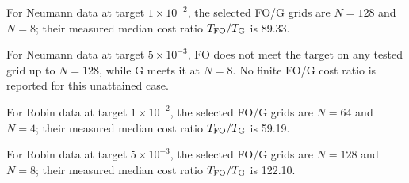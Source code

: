 For Neumann data at target $1\times10^{-2}$, the selected FO/G grids are $N=128$ and $N=8$; their measured median cost ratio $T_{\rm FO}/T_{\rm G}$ is 89.33. 

For Neumann data at target $5\times10^{-3}$, FO does not meet the target on any tested grid up to $N=128$, while G meets it at $N=8$. No finite FO/G cost ratio is reported for this unattained case. 

For Robin data at target $1\times10^{-2}$, the selected FO/G grids are $N=64$ and $N=4$; their measured median cost ratio $T_{\rm FO}/T_{\rm G}$ is 59.19. 

For Robin data at target $5\times10^{-3}$, the selected FO/G grids are $N=128$ and $N=8$; their measured median cost ratio $T_{\rm FO}/T_{\rm G}$ is 122.10. 
